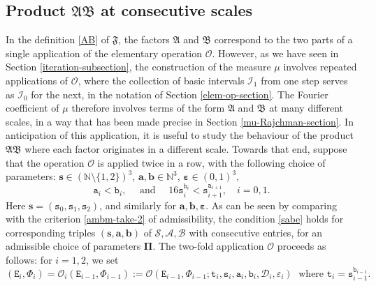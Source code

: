 \documentclass[12pt, twoside]{article}
\theoremstyle{definition}
\numberwithin{equation}{section}
\begin{document}
\subsection{Product $\mathfrak A \mathfrak B$ at consecutive scales} \label{AB-double-section} 
In the definition \eqref{AB} of $\mathfrak F$, the factors $\mathfrak A$ and $\mathfrak B$ correspond to the two parts of a single application of the elementary operation $\mathscr{O}$. However, as we have seen in Section \ref{iteration-subsection}, the construction of the measure $\mu$ involves repeated applications of $\mathscr{O}$, where the collection of basic intervals $\mathscr{I}_1$ from one step serves as $\mathscr{I}_0$ for the next, in the notation of Section \ref{elem-op-section}. The Fourier coefficient of $\mu$ therefore involves terms of the form $\mathfrak A$ and $\mathfrak B$ at many different scales, in a way that has been made precise in Section \ref{mu-Rajchman-section}. In anticipation of this application, it is useful to study the behaviour of the product $\mathfrak A \mathfrak B$ where each factor originates in a different scale. 
\vskip0.1in 
\noindent Towards that end, suppose that the operation $\mathscr{O}$ is applied twice in a row, with the following choice of parameters: $\mathbf s \in (\mathbb{N} \setminus \{1,2\})^3$, $\mathbf a, \mathbf b \in \mathbb N^{3}$, $\pmb{\varepsilon} \in (0,1)^3$, 
\begin{equation}  
\mathtt a_i < \mathtt b_i, \quad \text{ and } \quad 16 \mathtt s_{i}^{\mathtt b_i} < \mathtt s_{i+1}^{\mathtt a_{i+1}}, \quad i = 0,1. \label{sabe}   
\end{equation} 
Here $\mathbf s = (\mathtt s_0, \mathtt s_1, \mathtt s_2)$, and similarly for $\mathbf a, \mathbf b, \pmb{\varepsilon}$.  As can be seen by comparing with the criterion \eqref{ambm-take-2} of admissibility, the condition \eqref{sabe} holds for corresponding triples $(\mathbf s, \mathbf a, \mathbf b)$ of $\mathcal S, \mathcal A, \mathcal B$ with consecutive entries, for an admissible choice of parameters $\pmb{\Pi}$. 
\vskip0.1in 
\noindent The two-fold application $\mathscr{O}$ proceeds as follows: for $i = 1, 2$, we set 
\begin{equation*} 
(\mathtt E_{i}, \Phi_{i}) = \mathscr{O}_{i}(\mathtt E_{i-1}, \Phi_{i-1}) := \mathscr{O}(\mathtt E_{i-1}, \Phi_{i-1}; \mathtt t_{i}, \mathtt s_{i}, \mathtt a_{i}, \mathtt b_{i},  \mathscr{D}_i, \varepsilon_{i}) \; 
\text{ where } \mathtt t_{i} = \mathtt s_{i-1}^{\mathtt b_{i-1}}.
\end{equation*}
\end{document}
